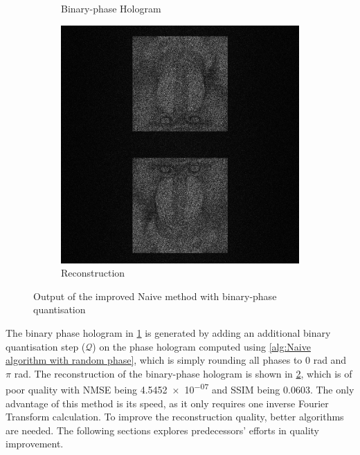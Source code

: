 \begin{figure}[H]
\begin{subfigure}[t]{0.3\textwidth}
    \caption{Binary-phase Hologram}
    \label{fig:Naive_binary_Holo}
  \end{subfigure}
  \hfill
  \begin{subfigure}[t]{0.3\textwidth}
    \centering
    \includegraphics[width=\textwidth]{Naive_binary_Recon.jpg}
    \caption{Reconstruction}
    \label{fig:Naive_binary_Recon}
  \end{subfigure}
  \caption{Output of the improved Naive method with binary-phase quantisation}
  \label{fig:Output of the improved Naive method with binary-phase quantisation}
\end{figure}

The binary phase hologram in \cref{fig:Naive_binary_Holo} is generated by adding an additional binary quantisation step ($\mathcal{Q}$) on the phase hologram computed using \cref{alg:Naive algorithm with random phase}, which is simply rounding all phases to 0 rad and $\pi$ rad. The reconstruction of the binary-phase hologram is shown in \cref{fig:Naive_binary_Recon}, which is of poor quality with NMSE being \num{4.5452e-07} and SSIM being 0.0603. The only advantage of this method is its speed, as it only requires one inverse Fourier Transform calculation. To improve the reconstruction quality, better algorithms are needed. The following sections explores predecessors' efforts in quality improvement.


